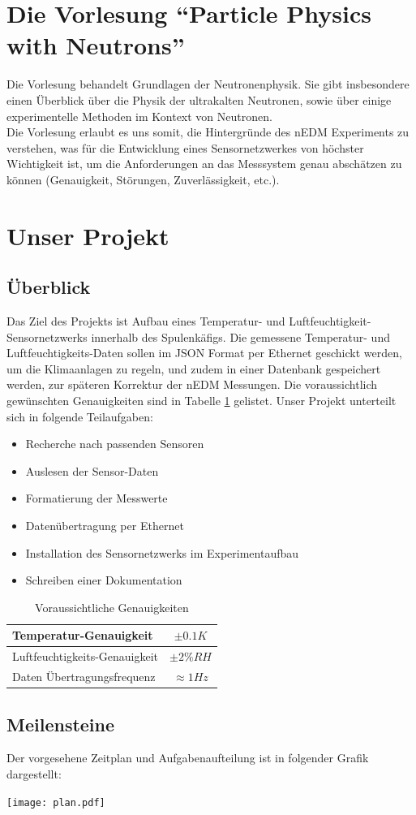 \documentclass[a4paper]{article} %
\begin{document}
\section*{Die Vorlesung ``Particle Physics with Neutrons''}
Die Vorlesung behandelt Grundlagen der Neutronenphysik. Sie gibt insbesondere
einen Überblick über die Physik der ultrakalten Neutronen, sowie über einige
experimentelle Methoden im Kontext von Neutronen.\\
Die Vorlesung erlaubt es uns somit, die Hintergründe des nEDM Experiments zu
verstehen, was für die Entwicklung eines Sensornetzwerkes von höchster
Wichtigkeit ist, um die Anforderungen an das Messsystem genau abschätzen zu
können (Genauigkeit, Störungen, Zuverlässigkeit, etc.).
\section*{Unser Projekt}
\subsection*{Überblick}
Das Ziel des Projekts ist Aufbau eines Temperatur- und Luftfeuchtigkeit-
Sensornetzwerks innerhalb des Spulenkäfigs. Die gemessene Temperatur- und 
Luft\-feuchtig\-keits-Daten sollen im JSON Format per Ethernet geschickt werden, um 
die Klimaanlagen zu regeln, und zudem in einer 
Datenbank gespeichert werden, zur späteren Korrektur der nEDM Messungen. 
Die voraus\-sichtlich gewünschten Genauig\-keiten sind in Tabelle \ref{tab:genauigkeit} gelistet.
Unser Projekt unterteilt sich in folgende Teilaufgaben:
\begin{itemize}
\item Recherche nach passenden Sensoren 
\item Auslesen der Sensor-Daten
\item Formatierung der Messwerte
\item Datenübertragung per Ethernet
\item Installation des Sensornetzwerks im Experimentaufbau
\item Schreiben einer Dokumentation
\end{itemize}
\begin{table}[h]
  \centering
  \begin{tabular}{|l|c|}
    \hline
    Temperatur-Genauigkeit & $\pm0.1 K$
    \\ \hline
    Luftfeuchtigkeits-Genauigkeit & $\pm 2\%RH$
    \\ \hline
    Daten Übertragungsfrequenz & $\approx 1Hz$
    \\ \hline
  \end{tabular}
  \caption{Voraussichtliche Genauigkeiten}
  \label{tab:genauigkeit}
\end{table}
\subsection*{Meilensteine}
Der vorgesehene Zeitplan und Aufgabenaufteilung ist in folgender Grafik dargestellt:
\begin{center}
\texttt{[image: plan.pdf]}
\end{center}
\end{document}
